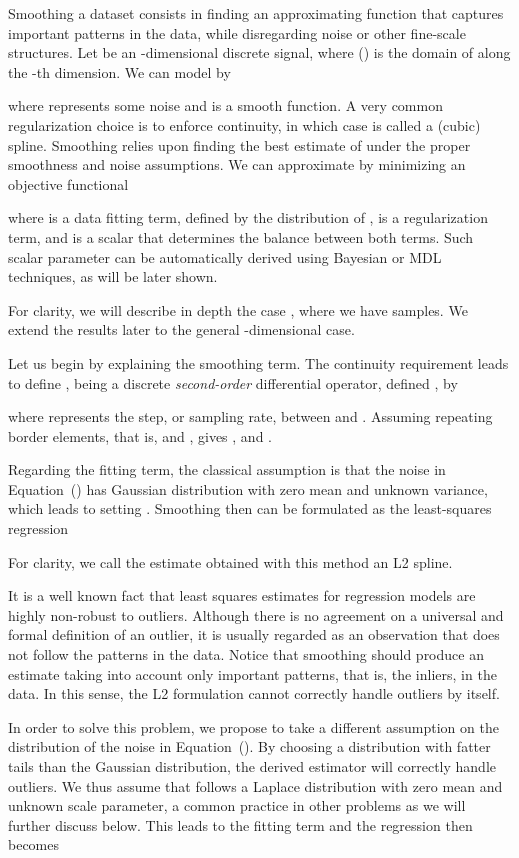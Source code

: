 \documentclass[preprint]{imsart}
\begin{document}
Smoothing a dataset consists in finding an approximating function that captures important patterns in the data, while disregarding noise or other fine-scale structures. Let  be an -dimensional discrete signal, where  () is the domain of  along the -th dimension. We can model  by

where  represents some noise and  is a smooth function. A very common regularization choice is to enforce  continuity, in which case  is called a (cubic) spline. Smoothing  relies upon finding the best estimate of  under the proper smoothness and noise assumptions.
We can approximate  by minimizing an objective functional

where  is a data fitting term, defined by the distribution of ,  is a regularization term, and  is a scalar that determines the balance between both terms. Such scalar parameter can be automatically derived using Bayesian or MDL techniques, as will be later shown.

For clarity, we will describe in depth the case , where we have  samples. We extend the results later to the general -dimensional case.

Let us begin by explaining the smoothing term.
The  continuity requirement leads to define ,  being a discrete \emph{second-order} differential operator, defined , by

where  represents the step, or sampling rate, between  and .
Assuming repeating border elements, that is,  and , gives , and .

Regarding the fitting term, the classical assumption is that the noise  in Equation~() has Gaussian distribution with zero mean and unknown variance, which leads to setting . 
Smoothing then can be formulated as the least-squares regression

For clarity, we call the estimate  obtained with this method an L2 spline.

It is a well known fact that least squares estimates for regression models are highly non-robust to outliers. Although there is no agreement on a universal and formal definition of an outlier, it is usually regarded as an observation that does not follow the patterns in the data. Notice that smoothing should produce an estimate  taking into account only important patterns, that is, the inliers, in the data. In this sense, the L2 formulation cannot correctly handle outliers by itself.

In order to solve this problem, we propose to take a different assumption on the distribution of the noise  in Equation~(). By choosing a distribution with fatter tails than the Gaussian distribution, the derived estimator will correctly handle outliers. We thus assume that  follows a Laplace distribution with zero mean and unknown scale parameter, a common practice in other problems as we will further discuss below. This leads to the fitting term  and the regression then becomes
\end{document}
